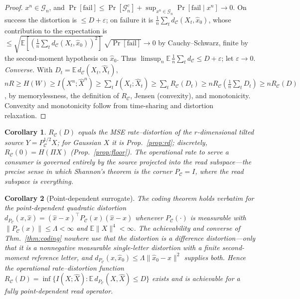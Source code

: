 \documentclass[lettersize,onecolumn]{IEEEtran}
\newtheorem{corollary}{Corollary}
\theoremstyle{definition}
\theoremstyle{remark}
\newcommand{\PC}{P_{\mathcal{C}}}
\newcommand{\E}{\mathbb{E}}
\begin{document}
\begin{proof}
$x^n\in\mathcal{G}_n$, and $\Pr[\mathrm{fail}]\le\Pr[\mathcal{G}_n^{c}]+
\sup_{x^n\in\mathcal{G}_n}\Pr[\mathrm{fail}\mid x^n]\to0$. On success the distortion is $\le D+\varepsilon$; on
failure it is $\tfrac1n\sum_t d_{\mathcal{C}}(X_t,\hat x_0)$, whose contribution to
the expectation is $\le\sqrt{\E[(\tfrac1n\sum_t d_{\mathcal{C}}(X_t,\hat x_0))^2]}\,
\sqrt{\Pr[\mathrm{fail}]}\to0$ by Cauchy--Schwarz, finite by the second-moment
hypothesis on $\hat x_0$. Thus $\limsup_n\E\,\tfrac1n\sum_t d_{\mathcal{C}}\le
D+\varepsilon$; let $\varepsilon\to0$.
\emph{Converse.} With $D_t=\E\,d_{\mathcal{C}}(X_t,\hat X_t)$,
$nR\ge H(W)\ge I(X^n;\hat X^n)\ge\sum_t I(X_t;\hat X_t)\ge\sum_t R_{\mathcal{C}}(D_t)
\ge nR_{\mathcal{C}}(\tfrac1n\sum_t D_t)\ge nR_{\mathcal{C}}(D)$, by memorylessness,
the definition of $R_{\mathcal{C}}$, Jensen (convexity), and monotonicity. Convexity
and monotonicity follow from time-sharing and distortion relaxation.
\end{proof}

\begin{corollary}\label{cor:coding}
$R_{\mathcal{C}}(D)$ equals the MSE rate--distortion of the $r$-dimensional tilted
source $Y=\PC^{1/2}X$; for Gaussian $X$ it is Prop.~\ref{prop:rd}; discretely,
$R_{\mathcal{C}}(0)=H(\Pi X)$ (Prop.~\ref{prop:floor}). The operational rate to serve
a consumer is governed entirely by the source projected into the read subspace---the
precise sense in which Shannon's theorem is the corner $\PC=I$, where the read
subspace is everything.
\end{corollary}

\begin{corollary}[Point-dependent surrogate]\label{cor:pointdep}
The coding theorem holds verbatim for the \emph{point-dependent} quadratic distortion
$d_{\PC}(x,\hat x)=(\hat x-x)^\top\PC(x)(\hat x-x)$ whenever $\PC(\cdot)$ is measurable
with $\|\PC(x)\|\le\Lambda<\infty$ and $\E\|X\|^4<\infty$. The achievability and
converse of Thm.~\ref{thm:coding} nowhere use that the distortion is a
\emph{difference} distortion---only that it is a nonnegative measurable single-letter
distortion with a finite second-moment reference letter, and $d_{\PC}(x,\hat x_0)\le
\Lambda\|\hat x_0-x\|^2$ supplies both. Hence the operational rate--distortion function
$R_{\mathcal{C}}(D)=\inf\{I(X;\hat X):\E\,d_{\PC}(X,\hat X)\le D\}$ exists and is
achievable for a fully point-dependent read operator.
\end{corollary}
\end{document}
